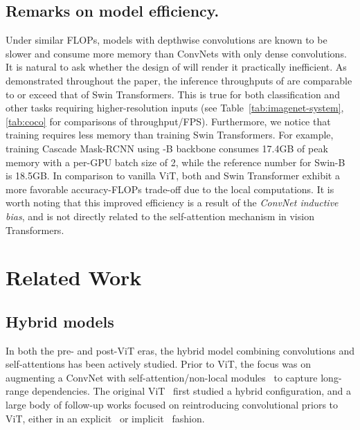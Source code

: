 \subsection{Remarks on model efficiency.} Under similar FLOPs, models with depthwise convolutions are known to be slower and consume more memory than ConvNets with only dense convolutions. It is natural to ask whether the design of \cnn{} will render it practically inefficient. As demonstrated throughout the paper, the inference throughputs of  are comparable to or exceed that of Swin Transformers. This is true for both classification and other tasks requiring higher-resolution inputs (see Table~\ref{tab:imagenet-system},\ref{tab:coco} for comparisons of throughput/FPS). Furthermore, we notice that training  requires less memory than training Swin Transformers. For example, training Cascade Mask-RCNN using \cnn{}-B backbone consumes 17.4GB of peak memory with a per-GPU batch size of 2, while the reference number for Swin-B is 18.5GB.
In comparison to vanilla ViT, both \cnn{} and Swin Transformer exhibit a more favorable accuracy-FLOPs trade-off due to the local computations. It is worth noting that this improved efficiency is a result of the \emph{ConvNet inductive bias}, and is not directly related to the self-attention mechanism in vision Transformers.


\section{Related Work}
\subsection{Hybrid models} 
In both the pre- and post-ViT eras, the hybrid model combining convolutions and self-attentions has been actively studied. 
Prior to ViT, the focus was on augmenting a ConvNet with self-attention/non-local modules~\cite{Wang2018,bello2019attention,srinivas2021bottleneck,ramachandran2019stand} to capture long-range dependencies.
The original ViT~\cite{Dosovitskiy2021} first studied a hybrid configuration, and a large body of follow-up works focused on reintroducing convolutional priors to ViT, either in an explicit~\cite{wu2021cvt, xu2021co, d2021convit, dai2021coatnet,Xiao2021, fan2021multiscale} or implicit~\cite{Liu2021swin} fashion.

